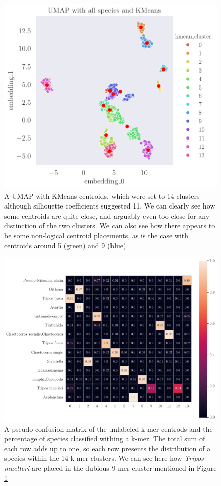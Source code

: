 \begin{figure}[H]
    \centering
    \includegraphics[width=1\linewidth]{latex/figures/kmeans_cluster_umap_on_all_species.pdf}
    \caption{A UMAP with KMeans centroids, which were set to 14 clusters although silhouette coefficients suggested 11. We can clearly see how some centroids are quite close, and arguably even too close for any distinction of the two clusters. We can also see how there appears to be some non-logical centroid placements, as is the case with centroids around 5 (green) and 9 (blue).}
    \label{fig:14-mer-umap}
\end{figure}

\begin{figure}[H]
    \centering
    \includegraphics[width=1\linewidth]{latex/figures/dinov2_confmat.pdf}
    \caption{A pseudo-confusion matrix of the unlabeled k-mer centrods and the percentage of species classified withing a k-mer. The total sum of each row adds up to one, so each row presents the distribution of a species within the 14 k-mer clusters. We can see here how \textit{Tripos muelleri} are placed in the dubious 9-mer cluster mentioned in Figure \ref{fig:14-mer-umap}}
    \label{fig:dinov2-confusion}
\end{figure}

